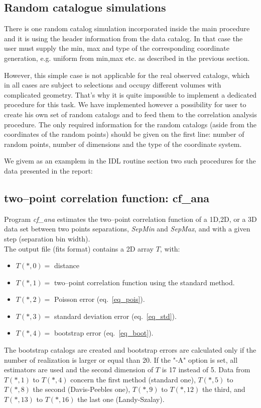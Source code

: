 \subsection{Random catalogue simulations}

There is one random catalog simulation incorporated inside the main
procedure and it is using the header information from the data
catalog. In that case the user must supply the min, max and type of
the corresponding coordinate generation, e.g. uniform from min,max
etc. as described in the previous section.

However, this simple case is not applicable for the real observed
catalogs, which in all cases are subject to selections and occupy
different volumes with complicated geometry. That's why it is quite
impossible to implement a dedicated procedure for this task. We have
implemented however a possibility for user to create his own set of
random catalogs and to feed them to the correlation analysis
procedure. The only required information for the random catalogs
(aside from the coordinates of the random points) should be given on
the first line: number of random points, number of dimensions and the
type of the coordinate system.

We givem as an examplem in the IDL routine section two such procedures 
for the data presented in the report:


\subsection{two--point correlation function: cf\_ana}
Program {\em cf\_ana} estimates the two--point correlation function of
a 1D,2D, or a 3D data set between two points separations, {\em SepMin} and
{\em SepMax}, and with a given step (separation bin width). \\

The output file (fits format) contains a 2D array $T$, with:
\begin{itemize}
\item $T(*,0) = $ distance
\item $T(*,1) = $ two--point correlation function using the standard
  method.
\item $T(*,2) = $ Poisson error (eq.~\ref{eq_pois}).
\item $T(*,3) = $ standard deviation error (eq.~\ref{eq_std}).
\item $T(*,4) = $ bootstrap error (eq.~\ref{eq_boot}).
\end{itemize}
The bootstrap catalogs are created and bootstrap errors are calculated
only if the number of realization is larger or equal than 20.  If the
"-A" option is set, all estimators are used and the second dimension
of $T$ is 17 instead of 5. Data from $T(*,1)$ to $T(*,4)$ concern the
first method (standard one), $T(*,5)$ to $T(*,8)$ the second
(Davis-Peebles one), $T(*,9)$ to $T(*,12)$ the third, and $T(*,13)$ to
$T(*,16)$ the last one (Landy-Szalay).

